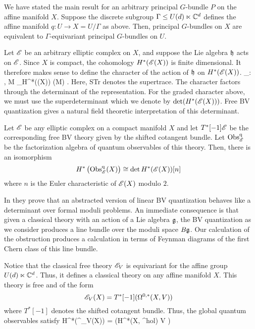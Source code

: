 \documentclass[10pt]{amsart}
\begin{document}
We have stated the main result for an arbitrary principal $G$-bundle $P$ on the affine manifold $X$. 
Suppose the discrete subgroup $\Gamma \leq U(d) \ltimes \mathbb C^d$ defines the affine manifold $q : U \to X = U / \Gamma$ as above. 
Then, principal $G$-bundles on $X$ are equivalent to $\Gamma$-equivariant principal $G$-bundles on $U$. 

Let $\mathscr E$ be an arbitrary elliptic complex on $X$, and suppose the Lie algebra $\mathfrak h$ acts on $\mathscr E$. 
Since $X$ is compact, the cohomology $H^*(\mathscr E(X))$ is finite dimensional.
It therefore makes sense to define the character of the action of $\mathfrak h$ on $H^*(\mathscr E(X))$.
\beqn\label{superchar}
\chi_\sE : \fh \to \CC \;\; , \;\; M \in \fh {}_{H^*(\sE(X))} (M) .
\eeqn
Here, STr denotes the supertrace. 
The character factors through the determinant of the representation.
For the graded character above, we must use the superdeterminant which we denote by $\det (H^*(\mathscr E(X)))$. 
Free BV quantization gives a natural field theoretic interpretation of this determinant.

\begin{prop} 
Let $\mathscr E$ be any elliptic complex on a compact manifold $X$ and let $T^*[-1] \mathscr E$ be the corresponding free BV theory given by the shifted cotangent bundle. 
Let ${\rm Obs}^{\rm q}_\mathscr E$ be the factorization algebra of quantum observables of this theory.
Then, there is an isomorphism
\[
H^* \left({\rm Obs}^{\rm q}_{\mathscr E}(X) \right) \cong \det H^*(\mathscr E(X)) [n]
\]
where $n$ is the Euler characteristic of $\mathscr E(X)$ modulo $2$. 
\end{prop}

\begin{rmk}
In \cite{GwilliamHaugseng} they prove that an abstracted version of linear BV quantization behaves like a determinant over formal moduli problems.
An immediate consequence is that given a classical theory with an action of a Lie algebra $\mathfrak g$, the BV quantization as we consider produces a line bundle over the moduli space $B \mathfrak g$. 
Our calculation of the obstruction produces a calculation in terms of Feynman diagrams of the first Chern class of this line bundle. 
\end{rmk}
 
Notice that the classical free theory $\mathscr E_V$ is equivariant for the affine group $U(d) \ltimes \mathbb C^d$.
Thus, it defines a classical theory on any affine manifold $X$.
This theory is free and of the form
\[
\mathscr E_V (X) = T^*[-1] (\Omega^{0,*}(X , V))
\]
where $T^*[-1]$ denotes the shifted cotangent bundle.
Thus, the global quantum observables satisfy
\beqn\label{quantum obs}
H^*(\Obs^\q_{V}(X)) = \det \left(H^*(X, \sO^{hol}) \tensor V \right)
\eeqn
 
\end{document}
